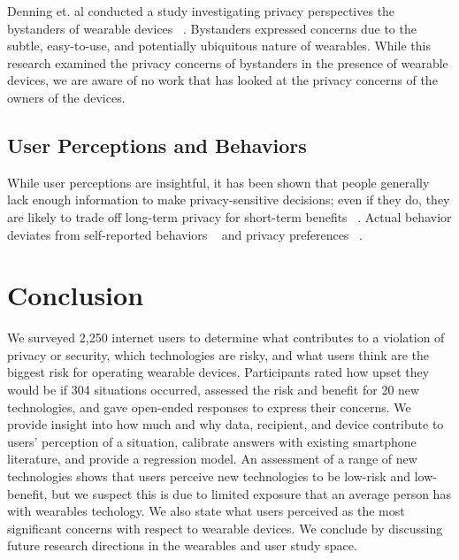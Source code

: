 \documentclass{acm_proc_article-sp}
\begin{document}
Denning et. al conducted a study investigating privacy perspectives the bystanders of wearable devices ~\cite{Denning2014}. Bystanders expressed concerns due to the subtle, easy-to-use, and potentially ubiquitous nature of wearables. While this research examined the privacy concerns of bystanders in the presence of wearable devices, we are aware of no work that has looked at the privacy concerns of the owners of the devices.

\subsection{User Perceptions and Behaviors}
While user perceptions are insightful, it has been shown that people generally lack enough information to make privacy-sensitive decisions; even if they do, they are likely to trade off long-term privacy for short-term benefits ~\cite{acquisti2005privacy}. Actual behavior deviates from self-reported behaviors ~\cite{jensen2005privacy} and privacy preferences ~\cite{spiekermann2001privacy}. 



\section{Conclusion}

We surveyed 2,250 internet users to determine what contributes to a violation of privacy or security, which technologies are risky, and what users think are the biggest risk for operating wearable devices. Participants rated how upset they would be if 304 situations occurred, assessed the risk and benefit for 20 new technologies, and gave open-ended responses to express their concerns. We provide insight into how much and why data, recipient, and device contribute to users' perception of a situation, calibrate answers with existing smartphone literature, and provide a regression model. An assessment of a range of new technologies shows that users perceive new technologies to be low-risk and low-benefit, but we suspect this is due to limited exposure that an average person has with wearables techology. We also state what users perceived as the most significant concerns with respect to wearable devices. We conclude by discussing future research directions in the wearables and user study space. 
\end{document}
